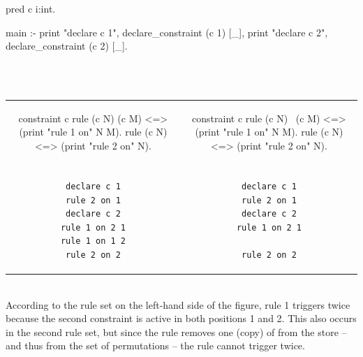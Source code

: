 \documentclass[a4paper, 11pt]{book}
\begin{document}
\begin{center}\begin{minipage}{.6\textwidth}
\begin{elpicodelj}
pred c i:int.

main :-
  print "declare c 1",
  declare_constraint (c 1) [_],
  print "declare c 2",
  declare_constraint (c 2) [_].
\end{elpicodelj}
\end{minipage}
~\\
\vspace{1em}
~\\
\bgroup
\setlength{\tabcolsep}{1em}
\begin{tabular}{c c}
\begin{minipage}{.44\textwidth}
\begin{elpicodelj}
constraint c {
  rule (c N) (c M) <=>
    (print "rule 1 on" N M).
  rule (c N) <=>
    (print "rule 2 on" N).
}
\end{elpicodelj}
\end{minipage} &
\begin{minipage}{.44\textwidth}
\begin{elpicodelj}
constraint c {
  rule (c N) \ (c M) <=>
    (print "rule 1 on" N M).
  rule (c N) <=>
    (print "rule 2 on" N).
}
\end{elpicodelj}
\end{minipage} \\
\\
\vspace{1em}
\begin{minipage}{.44\textwidth}
\begin{verbatim}
declare c 1
rule 2 on 1
declare c 2
rule 1 on 2 1
rule 1 on 1 2
rule 2 on 2
\end{verbatim}
\end{minipage} &
\begin{minipage}{.44\textwidth}
\begin{verbatim}
declare c 1
rule 2 on 1
declare c 2
rule 1 on 2 1

rule 2 on 2
\end{verbatim}
\end{minipage}
\end{tabular}
\egroup
\end{center}
~\\

According to the rule set on the left-hand side of the figure, rule 1
triggers twice because the second  constraint is active in both
positions 1 and 2. This also occurs in the second rule set, but since the
rule removes one (copy) of  from the store -- and thus from the set of
permutations -- the rule cannot trigger twice.
\end{document}
